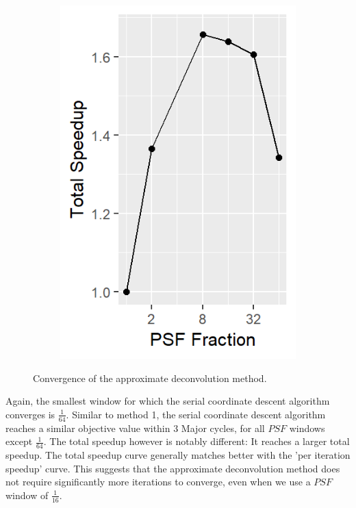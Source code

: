 \begin{figure}[h]
\begin{subfigure}[b]{0.195\linewidth}
	\end{subfigure}
	\begin{subfigure}[b]{0.195\linewidth}
		\includegraphics[width=\linewidth]{./chapters/10.results/gradient/ApproxDeconv/speedup_total.png}
	\end{subfigure}
	
	\caption{Convergence of the approximate deconvolution method.}
	\label{results:gradients:aproxDeconv}
\end{figure}

Again, the smallest window for which the serial coordinate descent algorithm converges is $\frac{1}{64}$. Similar to method 1, the serial coordinate descent algorithm reaches a similar objective value within 3 Major cycles, for all $PSF$ windows except $\frac{1}{64}$. The total speedup however is notably different: It reaches a larger total speedup. The total speedup curve generally matches better with the 'per iteration speedup' curve. This suggests that the approximate deconvolution method does not require significantly more iterations to converge, even when we use a $PSF$ window of $\frac{1}{16}$. 

